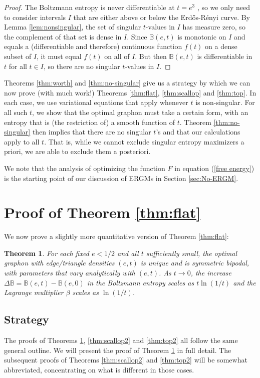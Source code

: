 \documentclass[12pt]{amsart}
\newtheorem{theorem}[lemma]{Theorem}
\newcommand{\ER}{Erd\H{o}s-R\'enyi}
\newcommand{\B}{\mathbb{B}}
\begin{document}
{\begin{proof} The Boltzmann entropy is never 
differentiable at $t=e^3$ \cite{RS3}, so we only need to consider intervals $I$ that are either above or
below the \ER{} curve. By Lemma \ref{lem:nonsingular}, the set of singular $t$-values in $I$ has measure zero, so
the complement of that set is dense in $I$. 
Since $\B(e,t)$ is monotonic on $I$ and equals a (differentiable and therefore) continuous function $f(t)$ on
a dense subset of $I$, it must equal $f(t)$ on all of $I$. But then $\B(e,t)$ is differentiable in $t$ for
all $t \in I$, so there are no singular $t$-values in $I$. 

\end{proof}

Theorems \ref{thm:worth} and \ref{thm:no-singular} give us a strategy by which we can now prove (with much work!) Theorems
\ref{thm:flat}, \ref{thm:scallop} and \ref{thm:top}. In each case, we use variational equations 
that apply whenever $t$ is 
non-singular. For all such $t$, we show that the optimal graphon must take a certain form, with an entropy that is 
(the restriction of) a smooth function of $t$. Theorem \ref{thm:no-singular} then implies that there are no 
singular $t$'s and that 
our calculations apply to all $t$. That is, while we cannot exclude singular entropy maximizers a priori, 
we are able to exclude them a posteriori. 

We note that the analysis of optimizing the function 
$F$ in equation (\ref{free energy}) is the starting 
point of our discussion of ERGMs in Section \ref{sec:No-ERGM}.
\section{Proof of Theorem \ref{thm:flat}} \label{sec:flat}

We now prove a slightly more quantitative version of 
Theorem \ref{thm:flat}: 
\begin{theorem} \label{thm:flat2}
For each fixed $e<1/2$ and all $t$ sufficiently small, the 
optimal graphon with edge/triangle densities $(e,t)$ is unique and is symmetric bipodal, with parameters that vary analytically with $(e,t)$. As $t \to 0$,
the increase $\Delta \B = \B(e,t)-\B(e,0)$ in the 
Boltzmann entropy scales as $t \ln(1/t)$ and the Lagrange multiplier 
$\beta$ scales as $\ln(1/t)$. 
\end{theorem} 

\subsection{Strategy}
The proofs of Theorems \ref{thm:flat2}, \ref{thm:scallop2} and \ref{thm:top2}
all follow the same general outline. 
We will present the proof of Theorem \ref{thm:flat2} in
full detail. The subsequent proofs of Theorems \ref{thm:scallop2} 
and \ref{thm:top2} will 
be somewhat abbreviated, concentrating on what is different in those
cases.

}
\end{document}
